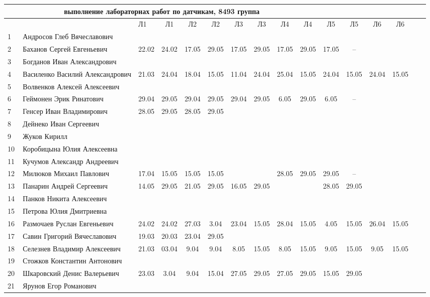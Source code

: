 \newpage
%
\begin{tabular}{l|llccccccccccccc}
\multicolumn{10}{c}{выполнение лабораторнах работ по датчикам, 8493 группа} \\
\toprule
&&Л1&Л1& Л2&Л2& Л3&Л3& Л4&Л4 &Л5&Л5& Л6&Л6\\
\midrule
1\,&  Андросов Глеб Вячеславович      &      &      &&&&&&\\
2\,&  Баханов Сергей Евгеньевич       & 22.02& 24.02&17.05&29.05& 17.05&29.05& 17.05& 29.05& 17.05 & -- \\
3\,&  Богданов Иван Александрович     &      &      &&&&&&\\
4\,&  Василенко Василий Александрович & 21.03& 24.04& 18.04& 15.05&11.04&24.04&25.04&15.05&24.04&15.05& 24.04&15.05\\
5\,&  Волвенков Алексей Алексеевич    &      &      &&&&&&\\
\midrule                                            
6\,&  Геймонен Эрик Ринатович         & 29.04 & 29.05 & 29.04 & 29.05 & 29.04 & 29.05 & 6.05 & 29.05 &6.05&--\\
7\,&  Генсер Иван Владимирович        & 28.05& 29.05&28.05& 29.05&&&&\\
8\,&  Дейнеко Иван Сергеевич          &      &      &&&&&&\\
9\,&  Жуков Кирилл                    &      &      &&&&&&\\
10\,& Коробицына Юлия Алексеевна      &      &      &&&&&&\\
\midrule                                            
11\,& Кучумов Александр Андреевич     &      &      &&&&&&\\
12\,& Милюков Михаил Павлович         &17.04 & 15.05&15.05&15.05&&&28.05&29.05&29.05&--\\
13\,& Панарин Андрей Сергеевич        &14.05 & 29.05& 21.05& 29.05 & 16.05&29.05&&&28.05&29.05\\
14\,& Панков Никита Алексеевич        &      &      &&&&&&\\
15\,& Петрова Юлия Дмитриевна         &      &      &&&&&&\\
\midrule                                            
16\,& Размочаев Руслан Евгеньевич     & 24.02& 24.02& 27.03&  3.04&23.04& 15.05& 28.04&15.05& 4.05& 15.05 & 26.04 & 15.05\\
17\,& Савин Григорий Вячеславович     & 19.03& 20.03& 23.04& 29.05&&&&\\
18\,& Селезнев Владимир Алексеевич    & 21.03& 03.04&  9.04& 9.04 & 8.05& 15.05& 8.05& 15.05 & 9.05& 15.05& 9.05& 15.05\\
19\,& Стожков Константин Антонович    &      &      &&&&&&\\
20\,& Шкаровский Денис Валерьевич     & 23.03& 3.04 & 9.04& 15.04& 27.05& 29.05 & 27.05& 29.05 & 15.05& 29.05\\
\midrule                                            
21\,& Ярунов Егор Романович           &      &      &&&&&&\\
\bottomrule
\end{tabular}

